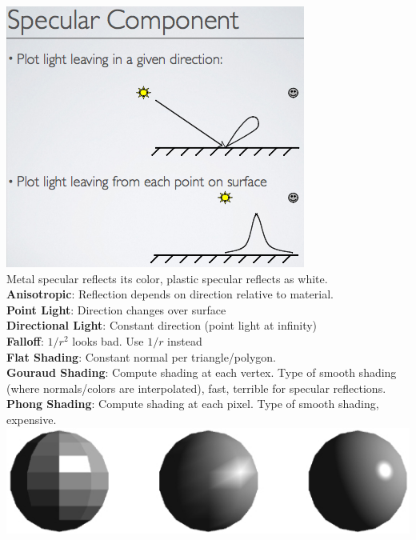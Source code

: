 \documentclass[3pt,landscape]{article}
\begin{document}
\begin{multicols}{3}
\includegraphics[scale=0.32]{images/specular}\\
Metal specular reflects its color, plastic specular reflects as white.\\
{\bf Anisotropic}: Reflection depends on direction relative to material.\\
{\bf Point Light}: Direction changes over surface\\
{\bf Directional Light}: Constant direction (point light at infinity)\\
{\bf Falloff}: \(1/r^2\) looks bad. Use \(1/r\) instead\\
{\bf Flat Shading}: Constant normal per triangle/polygon.\\
{\bf Gouraud Shading}: Compute shading at each vertex. Type of smooth shading (where normals/colors are interpolated), fast, terrible for specular reflections.\\
{\bf Phong Shading}: Compute shading at each pixel. Type of smooth shading, expensive.\\
\includegraphics[scale=0.4]{images/shading}\\


\end{multicols}
\end{document}
